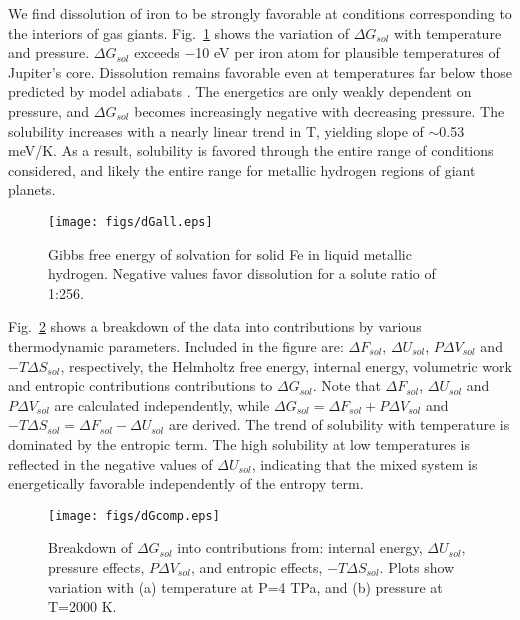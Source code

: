 We find dissolution of iron to be strongly favorable at conditions corresponding to
the interiors of gas giants. Fig.~\ref{fig:dGall}  shows the variation of $\Delta G_{sol}$
with temperature and pressure. $\Delta G_{sol}$ exceeds $-$10 eV per iron atom for
plausible temperatures of Jupiter's core. Dissolution remains favorable even
at temperatures far below those predicted by model adiabats
\citep{militzer2013a,militzer2013b}. The energetics
are only weakly dependent on pressure, and  $\Delta G_{sol}$ becomes increasingly
negative with decreasing pressure. The solubility increases with a nearly
linear trend in T, 
yielding slope of $\sim$0.53 meV/K. As a result, solubility is favored
through the entire range of conditions considered, and likely the entire range
for metallic hydrogen regions of giant planets.

 \begin{figure}[h] %
   \centering
   \texttt{[image: figs/dGall.eps]} 
\caption{Gibbs free energy of solvation for solid Fe in liquid metallic
    hydrogen. Negative values favor dissolution for a solute ratio of 1:256. \label{fig:dGall}}
\end{figure}

Fig.~\ref{fig:dGcomp} shows a breakdown of the data into contributions by various
thermodynamic parameters. Included in the figure are: $\Delta F_{sol}$, $\Delta U_{sol}$,
$P\Delta V_{sol}$ and $-T\Delta S_{sol}$, respectively, the Helmholtz free energy, internal
energy, volumetric work and entropic contributions contributions to $\Delta
G_{sol}$. Note that $\Delta F_{sol}$, $\Delta U_{sol}$ and $P\Delta V_{sol}$
are calculated independently, while $\Delta G_{sol}=\Delta F_{sol}+P\Delta
V_{sol}$ and $-T\Delta S_{sol}=\Delta F_{sol}-\Delta U_{sol}$ are derived. 
The trend of solubility with temperature is dominated by the entropic term.
The high solubility at low temperatures is
reflected in the negative values of $\Delta U_{sol}$, indicating that the
mixed system is energetically favorable independently of the entropy term. 

 \begin{figure}[h] %
   \centering
   \texttt{[image: figs/dGcomp.eps]} 
\caption{Breakdown of $\Delta G_{sol}$ into contributions from: internal
energy,
$\Delta U_{sol}$, pressure effects, $P\Delta V_{sol}$, and entropic effects,
$-T\Delta S_{sol}$. Plots show variation with (a) temperature at P=4 TPa, and
(b) pressure at T=2000 K. \label{fig:dGcomp}}
\end{figure}

